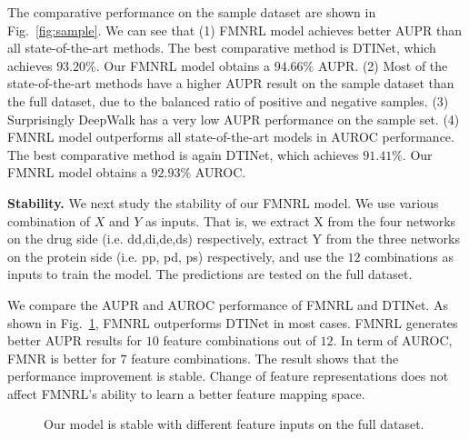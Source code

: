 \documentclass[sigconf,anonymous]{acmart}
\begin{document}
The comparative performance on the sample dataset are shown in Fig.~\ref{fig:sample}. We can see that (1) FMNRL model achieves better AUPR than all state-of-the-art methods. The best comparative method is DTINet, which achieves $93.20\%$. Our FMNRL model obtains a $94.66\%$ AUPR. (2) Most of the state-of-the-art methods have a higher AUPR result on the sample dataset than the full dataset, due to the balanced ratio of positive and negative samples. (3) Surprisingly DeepWalk has a very low AUPR performance on the sample set. (4) FMNRL model outperforms all state-of-the-art models in AUROC performance.  The best comparative method is again DTINet, which achieves $91.41\%$. Our FMNRL model obtains a $92.93\%$ AUROC. 

\textbf{Stability.} We next study the stability of our FMNRL model. We use various combination of $X$ and $Y$ as inputs. That is, we extract X from the four networks on the drug side (i.e. dd,di,de,ds) respectively, extract Y from the three networks on the protein side (i.e. pp, pd, ps) respectively, and use the $12$ combinations as inputs to train the model. The predictions are tested on the full dataset.

We compare the AUPR and AUROC performance of FMNRL and DTINet. As shown in Fig.~\ref{fig:stability}, FMNRL outperforms DTINet in most cases. FMNRL generates better AUPR results for $10$ feature combinations out of $12$. In term of AUROC, FMNR is better for $7$ feature combinations. The result shows that the performance improvement is stable. Change of feature representations does not affect FMNRL's ability to learn a better feature mapping space.

\begin{figure}[!ht]
\centering
{}

\vspace*{-10pt}
\caption{Our model is stable with different feature inputs on the full dataset.}\label{fig:stability}
\end{figure}
\end{document}
